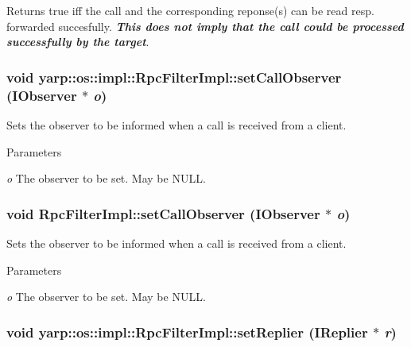 \begin{DoxyReturn}{Returns}
true iff the call and the corresponding reponse(s) can be read resp. forwarded succesfully. {\itshape {\bfseries This does not imply that the call could be processed successfully by the target}\/}. 
\end{DoxyReturn}
\hypertarget{classyarp_1_1os_1_1impl_1_1_rpc_filter_impl_a2d719a7c593fd21b8a7c4225c66a0234}{
\subsubsection[{setCallObserver}]{\setlength{\rightskip}{0pt plus 5cm}void yarp::os::impl::RpcFilterImpl::setCallObserver ({\bf IObserver} $\ast$ {\em o})}}
\label{classyarp_1_1os_1_1impl_1_1_rpc_filter_impl_a2d719a7c593fd21b8a7c4225c66a0234}
Sets the observer to be informed when a call is received from a client. 
\begin{DoxyParams}{Parameters}
\item[{\em o}]The observer to be set. May be {\ttfamily NULL}. \end{DoxyParams}
\hypertarget{classyarp_1_1os_1_1impl_1_1_rpc_filter_impl_aeca9c8a9d37355dd222a825bdb121c35}{
\subsubsection[{setCallObserver}]{\setlength{\rightskip}{0pt plus 5cm}void RpcFilterImpl::setCallObserver ({\bf IObserver} $\ast$ {\em o})}}
\label{classyarp_1_1os_1_1impl_1_1_rpc_filter_impl_aeca9c8a9d37355dd222a825bdb121c35}
Sets the observer to be informed when a call is received from a client. 
\begin{DoxyParams}{Parameters}
\item[{\em o}]The observer to be set. May be {\ttfamily NULL}. \end{DoxyParams}
\hypertarget{classyarp_1_1os_1_1impl_1_1_rpc_filter_impl_aecdd28fdc2cefb6e387b10aeeae47a2d}{
\subsubsection[{setReplier}]{\setlength{\rightskip}{0pt plus 5cm}void yarp::os::impl::RpcFilterImpl::setReplier ({\bf IReplier} $\ast$ {\em r})}}
